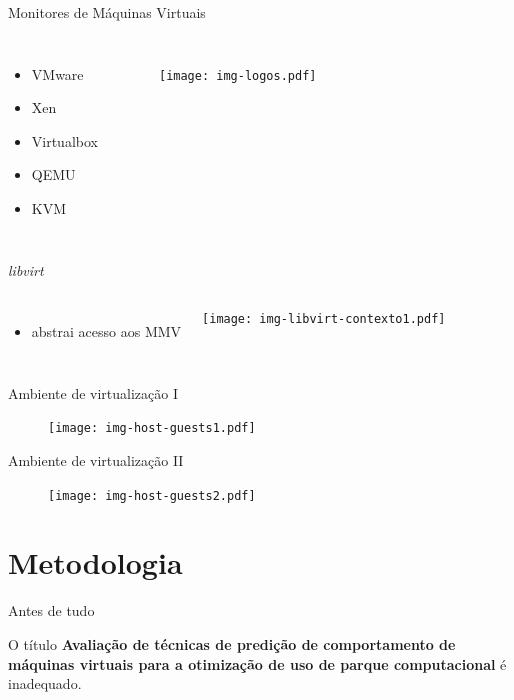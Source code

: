 \documentclass{beamer}
\begin{document}
\begin{frame}{Monitores de Máquinas Virtuais}
\begin{columns}[c]
\column{1.5in}
\begin{itemize}
  \item VMware
  \item Xen
  \item Virtualbox
  \item QEMU
  \item KVM
\end{itemize}
\column{1.5in}
\begin{figure}
\centering
\texttt{[image: img-logos.pdf]}
\end{figure}
\end{columns}
\end{frame}

\begin{frame}{\emph{libvirt}}
\begin{columns}[c]
\column{1.5in}
\begin{itemize}
  \item abstrai acesso aos MMV
\end{itemize}
\column{1.5in}
\texttt{[image: img-libvirt-contexto1.pdf]}
\end{columns}
\end{frame}

\begin{frame}{Ambiente de virtualização I}
\begin{figure}
\centering
%
%
\texttt{[image: img-host-guests1.pdf]}
\end{figure}
\end{frame}

\begin{frame}{Ambiente de virtualização II}
\begin{figure}
\texttt{[image: img-host-guests2.pdf]}
\end{figure}
\end{frame}

\section{Metodologia}

\begin{frame}{Antes de tudo}
\begin{block}{}
O título \textbf{Avaliação de técnicas de predição de comportamento de máquinas
virtuais para a otimização de uso de parque computacional} é inadequado.
\end{block}
\end{frame}
\end{document}

